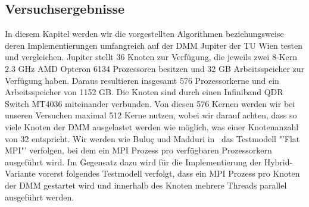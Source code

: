 \documentclass[11pt,a4paper]{article}
\begin{document}
\subsection{Versuchsergebnisse}
\label{sec:versuche}
In diesem Kapitel werden wir die vorgestellten Algorithmen beziehungsweise deren Implementierungen umfangreich auf der DMM Jupiter der TU Wien testen und vergleichen. Jupiter stellt 36 Knoten zur Verfügung, die jeweils zwei 8-Kern 2.3 GHz AMD Opteron 6134 Prozessoren besitzen und 32 GB Arbeitsspeicher zur Verfügung haben. Daraus resultieren insgesamt 576 Prozessorkerne und ein Arbeitsspeicher von 1152 GB. Die Knoten sind durch einen Infiniband QDR Switch MT4036 miteinander verbunden. Von diesen 576 Kernen werden wir bei unseren Versuchen maximal 512 Kerne nutzen, wobei wir darauf achten, dass so viele Knoten der DMM ausgelastet werden wie möglich, was einer Knotenanzahl von 32 entspricht. Wir werden wie Buluç und Madduri in~\cite{buluc} das Testmodell "'Flat MPI"' verfolgen, bei dem ein MPI Prozess pro verfügbaren Prozessorkern ausgeführt wird. Im Gegensatz dazu wird für die Implementierung der Hybrid-Variante vorerst folgendes Testmodell verfolgt, dass ein MPI Prozess pro Knoten der DMM gestartet wird und innerhalb des Knoten mehrere Threads parallel ausgeführt werden.\\
\end{document}
